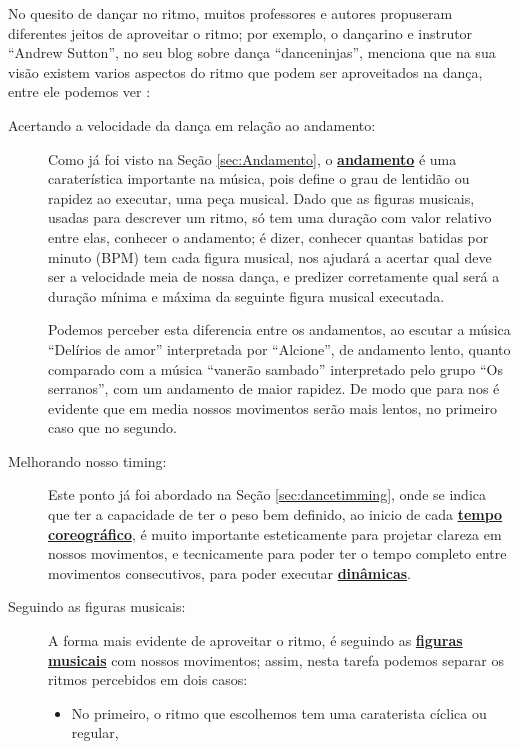 No quesito de dançar no ritmo, muitos professores e autores propuseram diferentes jeitos de aproveitar o ritmo; 
por exemplo, o dançarino e instrutor ``Andrew Sutton'', 
no seu blog sobre dança ``danceninjas'',
menciona que na sua visão existem varios aspectos do ritmo que podem ser aproveitados na dança,
entre ele podemos ver \cite{AndrewSuttonRitmo1}:  
\begin{description}
\item [Acertando a velocidade da dança em relação ao andamento:]
Como já foi visto na Seção \ref{sec:Andamento},
o \hyperref[sec:Andamento]{\textbf{andamento}} é uma caraterística importante na música,
pois define o grau de lentidão ou rapidez ao executar,
uma peça musical. 
Dado que as figuras musicais, usadas para descrever um ritmo, 
só tem uma duração com valor relativo entre elas,
conhecer o andamento; é dizer, conhecer quantas batidas por minuto (BPM) tem cada figura musical,
nos ajudará a acertar qual deve ser a velocidade meia de nossa dança,
e predizer corretamente qual será a duração mínima e máxima da seguinte figura musical executada.
\begin{example}
Podemos perceber esta diferencia entre os andamentos, 
ao escutar a música ``Delírios de amor'' interpretada por ``Alcione'', 
de andamento lento, 
quanto comparado com a música ``vanerão sambado'' interpretado pelo grupo ``Os serranos'', 
com um andamento de maior rapidez.
De modo que para nos é evidente que em media nossos movimentos serão mais lentos,
no primeiro caso que no segundo.
\end{example}
\item [Melhorando nosso timing:]
Este ponto já foi abordado na Seção \ref{sec:dancetimming},
onde se indica que ter a capacidade de ter o peso bem definido,
ao inicio de cada \hyperref[sec:TemposCoreograficos]{\textbf{tempo coreográfico}}, 
é muito importante esteticamente para projetar clareza em nossos movimentos,
e tecnicamente para poder ter o tempo completo entre movimentos consecutivos,
para poder executar \hyperref[sec:musicalidade:dinamicas]{\textbf{dinâmicas}}.
\item [Seguindo as figuras musicais:]
A forma mais evidente de aproveitar o ritmo, 
é seguindo as \hyperref[sec:figurasmusicais]{\textbf{figuras musicais}} com nossos movimentos;
assim, nesta tarefa podemos separar os ritmos percebidos em dois casos:
\begin{itemize} 
\item No primeiro, o ritmo que escolhemos tem uma caraterista cíclica ou regular,

\end{itemize}
\end{description}
